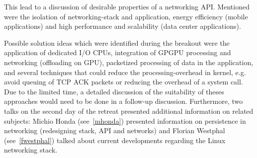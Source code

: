 This lead to a discussion of desirable properties of a networking API.
Mentioned were the isolation of networking-stack and application, energy
efficiency (mobile applications) and high performance and scalability (data
center applications).

Possible solution ideas which were identified during the breakout were the
application of dedicated I/O CPUs, integration of GPGPU processing and
networking (offloading on GPU), packetized processing of data in the
application, and several techniques that could reduce the processing-overhead
in kernel, e.g. avoid queuing of TCP ACK packets or reducing the overhead of a
system call. Due to the limited time, a detailed discussion of the suitability
of theses approaches would need to be done in a follow-up discussion.
Furthermore, two talks on the second day of the retreat presented additional
information on related subjects: Michio Honda (see~\autoref{mhonda}) presented
information on persistence in networking (redesigning stack, API and networks)
and Florian Westphal (see~\autoref{fwestphal}) talked about current
developments regarding the Linux networking stack.
